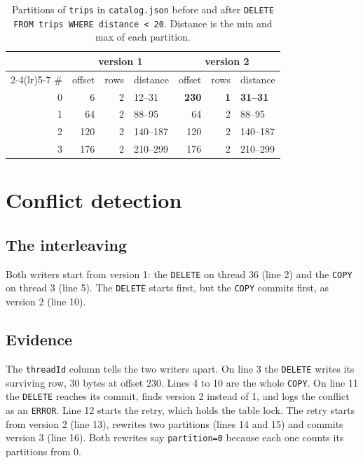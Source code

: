 \documentclass[11pt,a4paper,twocolumn]{article}
\begin{document}
\begin{table}[!htb]
  \centering
  \footnotesize
  \setlength{\tabcolsep}{5.5pt}
  \begin{tabular}{@{}r rrl rrl@{}}
    \toprule
     & \multicolumn{3}{c}{version 1} & \multicolumn{3}{c}{version 2} \\
    \cmidrule(lr){2-4}\cmidrule(lr){5-7}
    \# & offset & rows & distance & offset & rows & distance \\
    \midrule
    0 & 6 & 2 & 12--31 & \textbf{230} & \textbf{1} & \textbf{31--31} \\
    1 & 64 & 2 & 88--95 & 64 & 2 & 88--95 \\
    2 & 120 & 2 & 140--187 & 120 & 2 & 140--187 \\
    3 & 176 & 2 & 210--299 & 176 & 2 & 210--299 \\
    \bottomrule
  \end{tabular}
  \caption{Partitions of \texttt{trips} in \texttt{catalog.json} before and after \texttt{DELETE FROM trips WHERE distance \textless{} 20}. Distance is the min and max of each partition.}
  \label{tab:catalog-delete}
\end{table}


\section{Conflict detection}
\label{sec:conflict}

\subsection{The interleaving}

Both writers start from version 1: the \texttt{DELETE} on thread 36 (line 2) and the \texttt{COPY} on thread 3 (line 5). The \texttt{DELETE} starts first, but the \texttt{COPY} commits first, as version 2 (line 10).

\subsection{Evidence}

The \texttt{threadId} column tells the two writers apart. On line 3 the \texttt{DELETE} writes its surviving row, 30 bytes at offset 230. Lines 4 to 10 are the whole \texttt{COPY}. On line 11 the \texttt{DELETE} reaches its commit, finds version 2 instead of 1, and logs the conflict as an \texttt{ERROR}. Line 12 starts the retry, which holds the table lock. The retry starts from version 2 (line 13), rewrites two partitions (lines 14 and 15) and commits version 3 (line 16). Both rewrites say \texttt{partition=0} because each one counts its partitions from 0.
\end{document}
